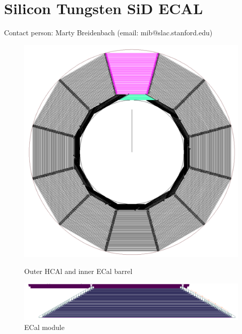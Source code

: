 \section{Silicon Tungsten SiD ECAL}
Contact person: Marty Breidenbach (email: mib@slac.stanford.edu)
\begin{figure}
	\centering
	\begin{minipage}[b]{.49\textwidth}
		\includegraphics[width=\linewidth]{Calorimeter/SiliconTungstenSiD/cross_section}
		\caption{Outer HCAl and inner ECal barrel}
		\label{fig:Calorimeter:SiDECAL:crosssection}
	\end{minipage}\hfill
	\begin{minipage}[b]{.49\textwidth}
		\includegraphics[width=\linewidth]{Calorimeter/SiliconTungstenSiD/ecalModule}
		\caption{ECal module}
		\label{fig:Calorimeter:SiDECAL:ecalModule}
	\end{minipage}
\end{figure}
